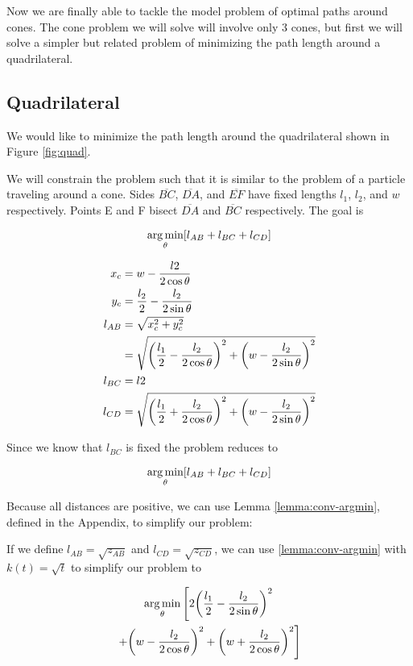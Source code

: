 Now we are finally able to tackle the model problem of optimal paths around cones. The cone problem we will solve will involve only 3 cones, but first we will solve a simpler but related problem of minimizing the path length around a quadrilateral.

\subsection{Quadrilateral}

We would like to minimize the path length around the quadrilateral shown in Figure \ref{fig:quad}.


We will constrain the problem such that it is similar to the problem of a particle traveling around a cone. Sides $\overline{BC}$, $\overline{DA}$, and $\overline{EF}$ have fixed lengths $l_1$, $l_2$, and $w$ respectively. Points E and F bisect $\overline{DA}$ and $\overline{BC}$ respectively. The goal is

\[
\argmin_{\theta} \bracket{l_{AB} + l_{BC} + l_{CD}}
\]

\begin{align}
  x_c& = w - \frac{l2}{2 \cos{\theta}}\\
  y_c& = \frac{l_2}{2} - \frac{l_2}{2 \sin{\theta}}\\
  l_{AB}& = \sqrt{x_c^2 + y_c^2}\\
  & = \sqrt{ \paren{\frac{l_1}{2} - \frac{l_2}{2 \cos\theta}}^2 + \paren{w - \frac{l_2}{2 \sin\theta}}^2 }\\
  l_{BC}& = l2\\
  l_{CD}& = \sqrt{\paren{\frac{l_1}{2} + \frac{l_2}{2 \cos\theta}}^2 + \paren{w - \frac{l_2}{2 \sin\theta}}^2 }
\end{align}

Since we know that $l_{BC}$ is fixed the problem reduces to

\[
\argmin_{\theta} \bracket{l_{AB} + l_{BC} + l_{CD}}
\]

Because all distances are positive, we can use Lemma \ref{lemma:conv-argmin}, defined in the Appendix, to simplify our problem:

If we define $l_{AB} = \sqrt{z_{AB}}$ and $l_{CD} = \sqrt{z_{CD}}$, we can use \ref{lemma:conv-argmin} with $k(t) = \sqrt{t}$ to simplify our problem to

\begin{multline}
  \argmin_{\theta} \left[ 2\paren{\frac{l_1}{2} - \frac{l_2}{2 \sin\theta}}^2 \right.\\
  \left. + \paren{w - \frac{l_2}{2 \cos\theta}}^2 + \paren{w + \frac{l_2}{2 \cos\theta}}^2 \right]
\end{multline}

